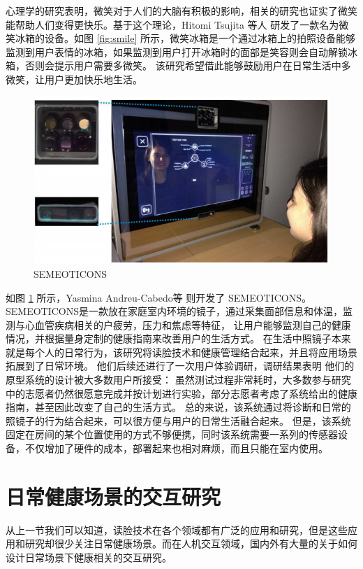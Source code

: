 心理学的研究表明，微笑对于人们的大脑有积极的影响\cite{williamarticle}，相关的研究也证实了微笑能帮助人们变得更快乐。基于这个理论，Hitomi Tsujita 等人\cite{Tsujita2011Smiling} 研发了一款名为微笑冰箱的设备。如图 \ref{fig:smile} 所示，微笑冰箱是一个通过冰箱上的拍照设备能够监测到用户表情的冰箱，如果监测到用户打开冰箱时的面部是笑容则会自动解锁冰箱，否则会提示用户需要多微笑。
该研究希望借此能够鼓励用户在日常生活中多微笑，让用户更加快乐地生活。 

\begin{figure}[h]
    \centering
    \includegraphics[width=12cm]{images/mirror.png}
    \caption{SEMEOTICONS}
    \label{fig:seme}
\end{figure}

如图 \ref{fig:seme} 所示，Yasmina Andreu-Cabedo等  \cite{andreu2015mirror}则开发了 SEMEOTICONS。
SEMEOTICONS是一款放在家庭室内环境的镜子，通过采集面部信息和体温，监测与心血管疾病相关的户疲劳，压力和焦虑等特征， 让用户能够监测自己的健康情况，并根据量身定制的健康指南来改善用户的生活方式。
在生活中照镜子本来就是每个人的日常行为，该研究将读脸技术和健康管理结合起来，并且将应用场景拓展到了日常环境。
他们后续还进行了一次用户体验调研，调研结果表明\cite{coppini2017user} 他们的原型系统的设计被大多数用户所接受： 虽然测试过程非常耗时，大多数参与研究中的志愿者仍然很愿意完成并按计划进行实验，部分志愿者考虑了系统给出的健康指南，甚至因此改变了自己的生活方式。
总的来说，该系统通过将诊断和日常的照镜子的行为结合起来，可以很方便与用户的日常生活融合起来。
但是，该系统固定在房间的某个位置使用的方式不够便携，同时该系统需要一系列的传感器设备，不仅增加了硬件的成本，部署起来也相对麻烦，而且只能在室内使用。

\section{日常健康场景的交互研究}

从上一节我们可以知道，读脸技术在各个领域都有广泛的应用和研究，但是这些应用和研究却很少关注日常健康场景。而在人机交互领域，国内外有大量的关于如何设计日常场景下健康相关的交互研究。

